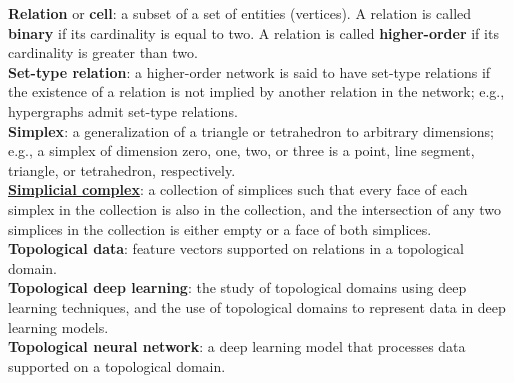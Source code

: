 \begin{tcolorbox}
\textbf{Relation} or \textbf{cell}\label{cell.term}: a subset of a set of entities (vertices).
A relation is called \textbf{binary} if its cardinality is equal to two.
A relation is called \textbf{higher-order} if its cardinality is greater than two.\\[1mm]
\textbf{Set-type relation}: a higher-order network is said to have set-type relations if the existence of a relation is not implied by another relation in the network; e.g., hypergraphs admit set-type relations.\\[1mm]  
\textbf{Simplex}: a generalization of a triangle or tetrahedron to arbitrary dimensions; e.g.,
a simplex of dimension zero, one, two, or three is a point, line segment, triangle, or tetrahedron, respectively.\\[1mm]
\textbf{\href{https://app.vectary.com/p/4HZRioKH7lZ2jWESIBrjhf}{Simplicial complex}}\label{SC.term}: a collection of simplices such that every face of each simplex in the collection is also in the collection, and the intersection of any two simplices in the collection is either empty or a face of both simplices.\\[1mm]
\textbf{Topological data}\label{TD.term}: feature vectors supported on relations in a topological domain.\\[1mm] 
\textbf{Topological deep learning}\label{TDL.term}: the study of topological domains using deep learning techniques, and the use of topological domains to represent data in deep learning models.\\ 
\textbf{Topological neural network}\label{TDL.term}: a deep learning model that processes data supported on a topological domain. 
\end{tcolorbox}

